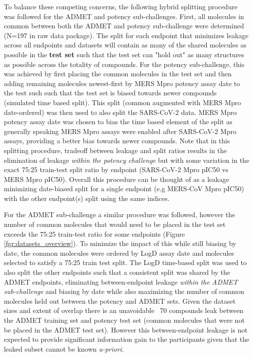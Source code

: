 \documentclass[journal=jcim,manuscript=article]{achemso}
\begin{document}
To balance these competing concerns, the following hybrid splitting procedure was followed for the ADMET and potency sub-challenges. First, all molecules in common between both the ADMET and potency sub-challenge were determined (N=197 in raw data package). The split for each endpoint that minimizes leakage across all endpoints and datasets will contain as many of the shared molecules as possible in the \textbf{test set} such that the test set can "hold out" as many structures as possible across the totality of compounds. For the potency sub-challenge, this was achieved by first placing the common molecules in the test set and then adding remaining molecules newest-first by MERS Mpro potency assay date to the test such such that the test set is biased towards newer compounds (simulated time based split). This split (common augmented with MERS Mpro date-ordered) was then used to also split the SARS-CoV-2 data.   MERS Mpro potency assay date was chosen to bias the time based element of the split as generally speaking MERS Mpro assays were enabled after SARS-CoV-2 Mpro assays, providing a better bias towards newer compounds. Note that in this splitting procedure, tradeoff between leakage and split ratios results in the elimination of leakage \textit{within the potency challenge} but with some variation in the exact 75:25 train-test split ratio by endpoint (SARS-CoV-2 Mpro pIC50 vs MERS Mpro pIC50). Overall this procedure can be thought of as a leakage minimizing date-biased split for a single endpoint (e.g MERS-CoV Mpro pIC50) with the other endpoint(s) split using the same indices.

For the ADMET sub-challenge a similar procedure was followed, however the number of common molecules that would need to be placed in the test set exceeds the 75:25 train-test ratio for some endpoints (Figure \ref{fgr:datasets_overview}). To minimize the impact of this while still biasing by date, the common molecules were ordered by LogD assay date and molecules selected to satisfy a 75:25 train test split. The LogD time-based split was used to also split the other endpoints such that a consistent split was shared by the ADMET endpoints, eliminating between-endpoint leakage \textit{within the ADMET sub-challenge} and biasing by date while also maximizing the number of common molecules held out between the potency and ADMET sets. Given the dataset sizes and extent of overlap there is an unavoidable ~70 compounds leak between the ADMET training set and potency test set (common molecules that were not be placed in the ADMET test set). However this between-endpoint leakage is not expected to provide significant information gain to the participants given that the leaked subset cannot be known \textit{a-priori}.
\end{document}
